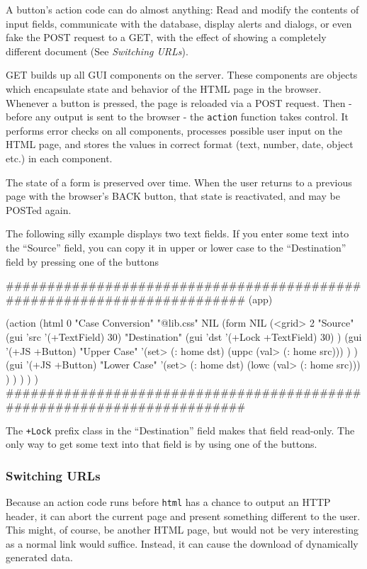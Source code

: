 A button's action code can do almost anything: Read and modify the
contents of input fields, communicate with the database, display alerts
and dialogs, or even fake the POST request to a GET, with the effect of
showing a completely different document (See \emph{Switching URLs}).

GET builds up all GUI components on the server. These components are
objects which encapsulate state and behavior of the HTML page in the
browser. Whenever a button is pressed, the page is reloaded via a POST
request. Then - before any output is sent to the browser - the \texttt{action}
function takes control. It performs error checks on all components,
processes possible user input on the HTML page, and stores the values in
correct format (text, number, date, object etc.) in each component.

The state of a form is preserved over time. When the user returns to a
previous page with the browser's BACK button, that state is reactivated,
and may be POSTed again.

The following silly example displays two text fields. If you enter some
text into the ``Source'' field, you can copy it in upper or lower case to
the ``Destination'' field by pressing one of the buttons


\begin{wideverbatim}
########################################################################
(app)

(action
   (html 0 "Case Conversion" "@lib.css" NIL
      (form NIL
         (<grid> 2
            "Source" (gui 'src '(+TextField) 30)
            "Destination" (gui 'dst '(+Lock +TextField) 30) )
         (gui '(+JS +Button) "Upper Case"
            '(set> (: home dst)
               (uppc (val> (: home src))) ) )
         (gui '(+JS +Button) "Lower Case"
            '(set> (: home dst)
               (lowc (val> (: home src))) ) ) ) ) )
########################################################################
\end{wideverbatim}

The \texttt{+Lock} prefix class in the ``Destination'' field makes that field
read-only. The only way to get some text into that field is by using one
of the buttons.

\subsubsection{ Switching URLs}
\label{sec:appl-devel-switching-urls}%

Because an action code runs before \texttt{html} has a chance to output an HTTP
header, it can abort the current page and present something different to
the user. This might, of course, be another HTML page, but would not be
very interesting as a normal link would suffice. Instead, it can cause
the download of dynamically generated data.

